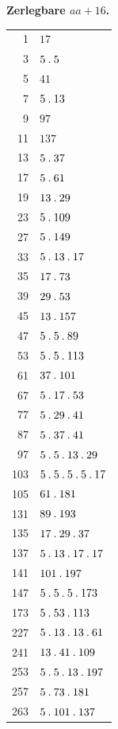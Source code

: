 \par{}
\begin{center}\textbf{Zerlegbare $aa+16$.}\end{center}
\begingroup\small\setlength{\tabcolsep}{5pt}
\begin{longtable}{@{}r|l@{}}
1 & $17$\\
3 & $5\mathbin{.} 5$\\
5 & $41$\\
7 & $5\mathbin{.} 13$\\
9 & $97$\\
11 & $137$\\
13 & $5\mathbin{.} 37$\\
17 & $5\mathbin{.} 61$\\
19 & $13\mathbin{.} 29$\\
23 & $5\mathbin{.} 109$\\
27 & $5\mathbin{.} 149$\\
33 & $5\mathbin{.} 13\mathbin{.} 17$\\
35 & $17\mathbin{.} 73$\\
39 & $29\mathbin{.} 53$\\
45 & $13\mathbin{.} 157$\\
47 & $5\mathbin{.} 5\mathbin{.} 89$\\
53 & $5\mathbin{.} 5\mathbin{.} 113$\\
61 & $37\mathbin{.} 101$\\
67 & $5\mathbin{.} 17\mathbin{.} 53$\\
77 & $5\mathbin{.} 29\mathbin{.} 41$\\
87 & $5\mathbin{.} 37\mathbin{.} 41$\\
97 & $5\mathbin{.} 5\mathbin{.} 13\mathbin{.} 29$\\
103 & $5\mathbin{.} 5\mathbin{.} 5\mathbin{.} 5\mathbin{.} 17$\\
105 & $61\mathbin{.} 181$\\
131 & $89\mathbin{.} 193$\\
135 & $17\mathbin{.} 29\mathbin{.} 37$\\
137 & $5\mathbin{.} 13\mathbin{.} 17\mathbin{.} 17$\\
141 & $101\mathbin{.} 197$\\
147 & $5\mathbin{.} 5\mathbin{.} 5\mathbin{.} 173$\\
173 & $5\mathbin{.} 53\mathbin{.} 113$\\
227 & $5\mathbin{.} 13\mathbin{.} 13\mathbin{.} 61$\\
241 & $13\mathbin{.} 41\mathbin{.} 109$\\
253 & $5\mathbin{.} 5\mathbin{.} 13\mathbin{.} 197$\\
257 & $5\mathbin{.} 73\mathbin{.} 181$\\
263 & $5\mathbin{.} 101\mathbin{.} 137$\\

\end{longtable}
